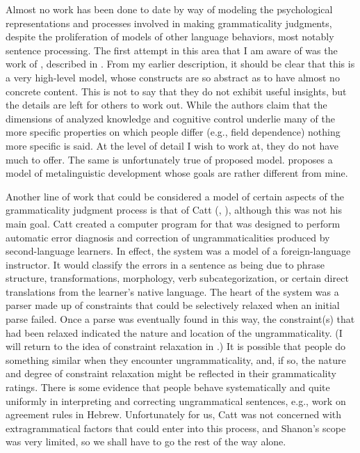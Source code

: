 Almost no work has been done to date by way of modeling the psychological representations and processes involved in making grammaticality judgments, despite the proliferation of models of other language behaviors, most notably sentence processing. The first attempt in this area that I am aware of was the work of \citet{BialystokEtAl1985}, described in . From my earlier description, it should be clear that this is a very high-level model, whose constructs are so abstract as to have almost no concrete content. This is not to say that they do not exhibit useful insights, but the details are left for others to work out. While the authors claim that the dimensions of analyzed knowledge and cognitive control underlie many of the more specific properties on which people differ (e.g., field dependence) nothing more specific is said. At the level of detail I wish to work at, they do not have much to offer. The same is unfortunately true of  proposed model. \citet{Gombert1992} proposes a model of metalinguistic development whose goals are rather different from mine.

Another line of work that could be considered a model of certain aspects of  the grammaticality judgment  process is that of Catt (\citeyear{Catt1988}, \citealt{CattEtAl1990}),
although this was not his main goal. Catt created a computer program for  that was designed to perform automatic error diagnosis and correction of ungrammaticalities produced by second-language learners. In effect, the system was a model of a foreign-language instructor. It would classify the errors in a sentence as being due to phrase structure, transformations, morphology, verb subcategorization, or certain direct translations from the learner's native language. The heart of the system was a parser made up of
constraints that could be selectively relaxed when an initial parse failed. Once a parse was eventually found in this way, the constraint(s) that had been relaxed indicated the nature and location of the ungrammaticality. (I will return to the idea of constraint relaxation in .) It is possible that people do something similar when they encounter ungrammaticality, and, if so, the nature and degree of constraint relaxation might be reflected in their grammaticality ratings. There is some evidence that people behave systematically and quite uniformly in interpreting and correcting ungrammatical sentences, e.g.,  work on agreement rules in Hebrew. Unfortunately for us, Catt was not concerned with extragrammatical factors that could enter into this process, and Shanon's scope was very limited, so we shall have to go the rest of the way alone.

